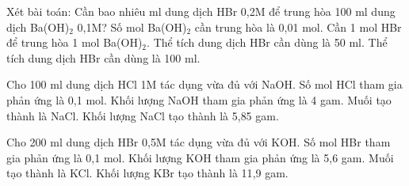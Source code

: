 \documentclass[Main.tex]{subfiles}
\begin{document}
    \begin{ex}
    Xét bài toán: Cần bao nhiêu ml dung dịch HBr 0{,}2M để trung hòa 100 ml dung dịch Ba(OH)$_2$ 0{,}1M?
    \choiceTF
    {\True Số mol Ba(OH)$_2$ cần trung hòa là 0{,}01 mol.}
    {\True Cần 1 mol HBr để trung hòa 1 mol Ba(OH)$_2$.}
    {Thể tích dung dịch HBr cần dùng là 50 ml.}
    {\True Thể tích dung dịch HBr cần dùng là 100 ml.}
    \end{ex}
    
    \begin{ex}
    Cho 100 ml dung dịch HCl 1M tác dụng vừa đủ với NaOH.
    \choiceTF
    {\True Số mol HCl tham gia phản ứng là 0{,}1 mol.}
    {Khối lượng NaOH tham gia phản ứng là 4 gam.}
    {\True Muối tạo thành là NaCl.}
    {\True Khối lượng NaCl tạo thành là 5{,}85 gam.}
    \end{ex}
    
    \begin{ex}
    Cho 200 ml dung dịch HBr 0{,}5M tác dụng vừa đủ với KOH.
    \choiceTF
    {\True Số mol HBr tham gia phản ứng là 0{,}1 mol.}
    {\True Khối lượng KOH tham gia phản ứng là 5{,}6 gam.}
    {Muối tạo thành là KCl.}
    {\True Khối lượng KBr tạo thành là 11{,}9 gam.}
    \end{ex}
    
\end{document}
